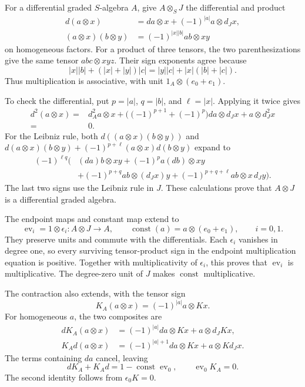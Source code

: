 For a differential graded $S$-algebra $A$, give $A\otimes_S J$ the
differential and product
\[
 \begin{split}
 d(a\otimes x)&=da\otimes x+(-1)^{|a|}a\otimes d_Jx,\\
 (a\otimes x)(b\otimes y)&=(-1)^{|x||b|}ab\otimes xy
 \end{split}
\]
on homogeneous factors.
For a product of three tensors, the two parenthesizations give the same
tensor $abc\otimes xyz$.
Their sign exponents agree because
\[
 |x||b|+(|x|+|y|)|c|
 =|y||c|+|x|(|b|+|c|).
\]
Thus multiplication is associative, with unit
$1_A\otimes(e_0+e_1)$.

To check the differential, put $p=|a|$, $q=|b|$, and $\ell=|x|$.
Applying it twice gives
\[
 \begin{split}
 d^2(a\otimes x)
 ={}&d_A^2a\otimes x
 +\bigl((-1)^{p+1}+(-1)^p\bigr)da\otimes d_Jx
 +a\otimes d_J^2x\\
 ={}&0.
 \end{split}
\]
For the Leibniz rule, both
$d((a\otimes x)(b\otimes y))$ and
$d(a\otimes x)(b\otimes y)+(-1)^{p+\ell}(a\otimes x)d(b\otimes y)$
expand to
\[
 \begin{split}
 (-1)^{\ell q}\bigl(&
 (da)b\otimes xy+(-1)^p a(db)\otimes xy\\
 &+(-1)^{p+q}ab\otimes(d_Jx)y
 +(-1)^{p+q+\ell}ab\otimes x\,d_Jy\bigr).
 \end{split}
\]
The last two signs use the Leibniz rule in $J$.
These calculations prove that $A\otimes J$ is a differential graded algebra.

The endpoint maps and constant map extend to
\[
 \operatorname{ev}_i=1\otimes\epsilon_i:A\otimes J\longrightarrow A,
 \qquad
 \operatorname{const}(a)=a\otimes(e_0+e_1),\qquad i=0,1.
\]
They preserve units and commute with the differentials.
Each $\epsilon_i$ vanishes in degree one, so every surviving
tensor-product sign in the endpoint multiplication equation is positive.
Together with multiplicativity of $\epsilon_i$, this proves that
$\operatorname{ev}_i$ is multiplicative.
The degree-zero unit of $J$ makes $\operatorname{const}$ multiplicative.

The contraction also extends, with the tensor sign
\[
 K_A(a\otimes x)=(-1)^{|a|}a\otimes Kx.
\]
For homogeneous $a$, the two composites are
\[
 \begin{split}
 dK_A(a\otimes x)
 &=(-1)^{|a|}da\otimes Kx+a\otimes d_JKx,\\
 K_Ad(a\otimes x)
 &=(-1)^{|a|+1}da\otimes Kx+a\otimes Kd_Jx.
 \end{split}
\]
The terms containing $da$ cancel, leaving
\[
 dK_A+K_Ad=1-\operatorname{const}\operatorname{ev}_0,
 \qquad \operatorname{ev}_0K_A=0.
\]
The second identity follows from $\epsilon_0K=0$.

